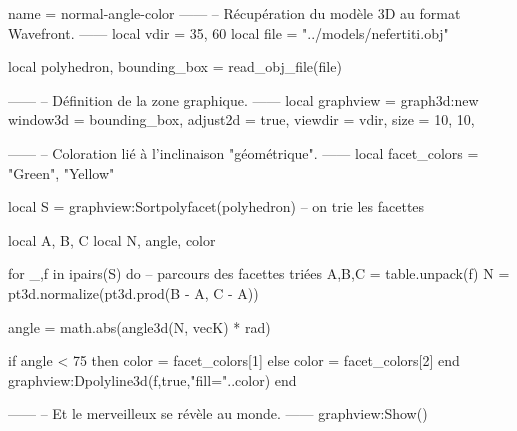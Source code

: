 \documentclass{standalone}
\begin{document}
\begin{luadraw}{name = normal-angle-color}
------
-- Récupération du modèle 3D au format Wavefront.
------
local vdir = {35, 60}
local file = "../models/nefertiti.obj"

local polyhedron, bounding_box = read_obj_file(file)

------
-- Définition de la zone graphique.
------
local graphview = graph3d:new{
  window3d = bounding_box,
  adjust2d = true,
  viewdir  = vdir,
  size     = {10, 10},
}

------
-- Coloration lié à l'inclinaison "géométrique".
------
local facet_colors = {"Green", "Yellow"}

local S = graphview:Sortpolyfacet(polyhedron) -- on trie les facettes

local A, B, C
local N, angle, color

for _,f in ipairs(S) do  -- parcours des facettes triées
  A,B,C = table.unpack(f)
  N = pt3d.normalize(pt3d.prod(B - A, C - A))

  angle = math.abs(angle3d(N, vecK) * rad)


  if angle < 75 then
    color = facet_colors[1]
  else
    color = facet_colors[2]
  end
  graphview:Dpolyline3d(f,true,"fill="..color)
end

------
-- Et le merveilleux se révèle au monde.
------
graphview:Show()

\end{luadraw}
\end{document}
